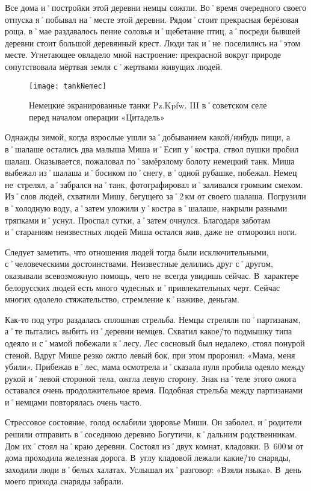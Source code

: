 Все дома и˚постройки этой деревни немцы сожгли. Во˚время очередного своего отпуска я˚побывал на˚месте этой деревни. Рядом˚стоит прекрасная берёзовая роща, в˚мае раздавалось пение соловья и˚щебетание птиц, а˚посреди бывшей деревни стоит большой деревянный крест. Люди так и˚не~поселились на˚этом месте. Угнетающее овладело мной настроение: прекрасной вокруг природе сопутствовала мёртвая земля с˚жертвами живущих людей. 

\begin{wrapfigure}{O}{.4\textwidth}
\centering
\texttt{[image: tankNemec]}
\caption{Немецкие экранированные танки Pz.Kpfw. III в˚советском селе перед началом операции «Цитадель»}
\label{fig:tankNemec}
\end{wrapfigure}

Однажды зимой, когда взрослые ушли за˚добыванием какой\-/нибудь пищи, а в˚шалаше остались два малыша Миша и˚Есип у˚костра, ствол пушки пробил шалаш. Оказывается, пожаловал по˚замёрзлому болоту немецкий танк. Миша выбежал из˚шалаша и˚босиком по˚снегу, в˚одной рубашке, побежал. Немец не~стрелял, а˚забрался на˚танк, фотографировал и˚заливался громким смехом. Из˚слов людей, схватили Мишу, бегущего за˚2\,км от своего шалаша. Погрузили в˚холодную воду, а˚затем уложили у˚костра в˚шалаше, накрыли разными тряпками и˚уснул. Проспал сутки, а˚затем очнулся. Благодаря заботам и˚стараниям неизвестных людей Миша остался жив, даже не~отморозил ноги.

Следует заметить, что отношения людей тогда были исключительными, с˚человеческими достоинствами. Неизвестные делились друг с˚другом, оказывали всевозможную помощь, чего не~всегда увидишь сейчас. В~характере белорусских людей есть много чудесных и˚привлекательных черт. Сейчас многих одолело стяжательство, стремление к˚наживе, деньгам.

Как-то под утро раздалась сплошная стрельба. Немцы стреляли по˚партизанам, а˚те пытались выбить из˚деревни немцев. Схватил какое\=/то подмышку типа одеяло и с˚мамой побежали к˚лесу. Лес сосновый был недалеко, стоял понурой стеной. Вдруг Мише резко ожгло левый бок, при этом проронил: «Мама, меня убили». Прибежав в˚лес, мама осмотрела и˚сказала пуля пробила одеяло между рукой и˚левой стороной тела, ожгла левую сторону. Знак на˚теле этого ожога оставался очень продолжительное время. Подобная стрельба между партизанами и˚немцами повторялась очень часто.

Стрессовое состояние, голод ослабили здоровье Миши. Он заболел, и˚родители решили отправить в˚соседнюю деревню Богутичи, к˚дальним родственникам. Дом их˚стоял на˚краю деревни. Состоял из˚двух комнат, кладовки. В~600\,м от дома проходила железная дорога. В~углу кладовой лежали какие\=/то снаряды, заходили люди в˚белых халатах. Услышал их˚разговор: «Взяли языка». В~день моего прихода снаряды забрали. 

